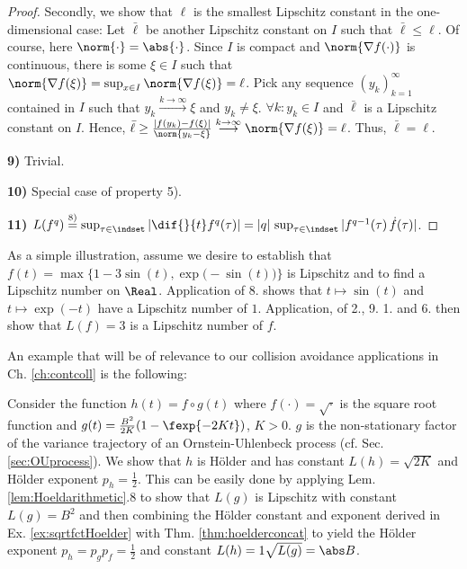 \begin{lem}
\begin{proof}
Secondly, we show that $\ell$ is the smallest Lipschitz constant in the one-dimensional case: Let $\bar \ell$ be another Lipschitz constant on $I$ such that $\bar \ell \leq \ell$. Of course, here $\norm{\cdot} = \abs{\cdot}$. Since $I$ is compact and $\norm{\nabla f(\cdot) }$ is continuous, there is some $\xi \in I$ such that $\norm{\nabla f(\xi)} = \sup_{x \in I} \norm{\nabla f(\xi)} = \ell$. Pick any sequence $(y_k)_{k=1}^\infty$ contained in $I$ such that $y_k \stackrel{k \to \infty}{\longrightarrow} \xi$ and $y_k \neq \xi$.
$\forall k: y_k \in I $ and $\bar \ell$ is a Lipschitz constant on $I$. Hence, $ \bar \ell \geq \frac{|f(y_k) - f(\xi)|}{\norm{y_k-\xi}}\stackrel{k \to \infty}{\longrightarrow} \norm{ \nabla f(\xi)} = \ell$. Thus, $\bar \ell = \ell$.

\textbf{9)} Trivial. 

\textbf{10)} Special case of property 5).

\textbf{11)} $L(f^q) \stackrel{8)}{=} \sup_{\tau \in \indset } |\dif{}{t} f^q(\tau)| = |q| \,\sup_{\tau \in \indset } |f^{q-1}(\tau) \, \dot f(\tau)| $. 

\end{proof}
\end{lem} 

As a simple illustration, assume we desire to establish that $f(t) = \max\{ 1- 3 \sin(t), \exp\bigl(- \sin(t) \bigr)\}$ is Lipschitz and to find a Lipschitz number on $\Real$. Application of 8. shows that $t \mapsto \sin(t)$ and $t \mapsto \exp(- t)$ have a Lipschitz number of $1$. Application, of 2., 9. 1. and 6. then show that $L(f) =3$ is a Lipschitz number of $f$.


An example that will be of relevance to our collision avoidance applications in Ch. \ref{ch:contcoll} is the following:
\begin{ex} \label{ex:hoelderOUstd}
Consider the function $h(t) = f \circ g(t)$ where $f(\cdot) = \sqrt \cdot$ is the square root function and $g(t) = \frac{B^2}{2 K} (1- \fexp{-2Kt}) $, $K >0$. $g$ is the non-stationary factor of the variance trajectory of an Ornstein-Uhlenbeck process (cf. Sec. \ref{sec:OUprocess}). We show that $h$ is H\"older and has constant $L(h)= \sqrt{2K}$ and H\"older exponent $p_h = \frac 1 2$. This can be easily done by applying Lem. \ref{lem:Hoeldarithmetic}.8 to show that $L(g)$ is Lipschitz with constant $L(g) = B^2 $ and then combining the H\"older constant and exponent derived in Ex. \ref{ex:sqrtfctHoelder} with Thm. \ref{thm:hoelderconcat} to yield the H\"older exponent $p_h = p_g p_f = \frac 1 2$ and constant $L(h) = 1 \sqrt{L(g)}  = \abs B$.  
\end{ex}

